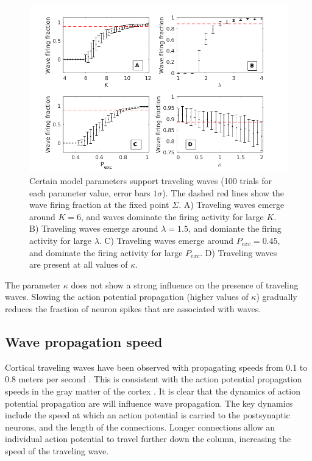 \documentclass[a4paper,11pt]{article}
\begin{document}
\begin{figure}[!htb]
 \centering
 \includegraphics[width=\textwidth]{fig/ParamWaveSim}
 \caption{Certain model parameters support traveling waves (100 trials for each parameter value, error bars $1\sigma$). The dashed red lines show the wave firing fraction at the fixed point $\Sigma$. A) Traveling waves emerge around $K=6$, and waves dominate the firing activity for large $K$. B) Traveling waves emerge around $\lambda=1.5$, and domiante the firing activity for large $\lambda$. C) Traveling waves emerge around $P_{exc}=0.45$, and dominate the firing activity for large $P_{exc}$. D) Traveling waves are present at all values of $\kappa$. }
 \label{fig:wave_parameters}
\end{figure}

\FloatBarrier

The parameter $\kappa$ does not show a strong influence on the presence of traveling waves. 
Slowing the action potential propagation (higher values of $\kappa$) gradually reduces the fraction of neuron spikes that are associated with waves.


\subsection{Wave propagation speed} \label{sub:propagation_speed}
Cortical traveling waves have been observed with propagating speeds from 0.1 to 0.8 meters per second \cite{sato2012}.
This is consistent with the action potential propagation speeds in the gray matter of the cortex \cite{muller2018}.
It is clear that the dynamics of action potential propagation are will influence wave propagation.
The key dynamics include the speed at which an action potential is carried to the postsynaptic neurons, and the length of the connections.
Longer connections allow an individual action potential to travel further down the column, increasing the speed of the traveling wave.
\end{document}
